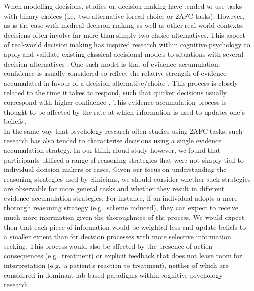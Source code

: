 \documentclass[a4paper, nobind]{templates/ociamthesis}
\begin{document}
When modelling decisions, studies on decision making have tended to use tasks with binary choices (i.e.~two-alternative forced-choice or 2AFC tasks). However, as is the case with medical decision making as well as other real-world contexts, decisions often involve far more than simply two choice alternatives. This aspect of real-world decision making has inspired research within cognitive psychology to apply and validate existing classical decisional models to situations with several decision alternatives \autocite{churchland2012,tajima2019,busemeyer2019,trueblood2022}. One such model is that of evidence accumulation: confidence is usually considered to reflect the relative strength of evidence accumulated in favour of a decision alternative/choice \autocite{vickers_effects_1982}. This process is closely related to the time it takes to respond, such that quicker decisions usually correspond with higher confidence \autocite{kiani_choice_2014}. This evidence accumulation process is thought to be affected by the rate at which information is used to updates one's beliefs \autocite{kloosterman_humans_2019}.\\

In the same way that psychology research often studies using 2AFC tasks, such research has also tended to characterise decisions using a single evidence accumulation strategy. In our think-aloud study however, we found that participants utilised a range of reasoning strategies that were not simply tied to individual decision makers or cases. Given our focus on understanding the reasoning strategies used by clinicians, we should consider whether such strategies are observable for more general tasks and whether they result in different evidence accumulation strategies. For instance, if an individual adopts a more thorough reasoning strategy (e.g.~scheme induced), they can expect to receive much more information given the thoroughness of the process. We would expect then that each piece of information would be weighted less and update beliefs to a smaller extent than for decision processes with more selective information seeking. This process would also be affected by the presence of action consequences (e.g.~treatment) or explicit feedback that does not leave room for interpretation (e.g.~a patient's reaction to treatment), neither of which are considered in dominant lab-based paradigms within cognitive psychology research.\\
\end{document}
